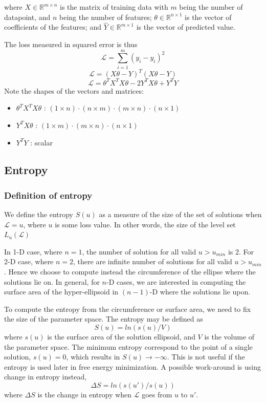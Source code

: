 \documentclass{article}
\begin{document}
where $X \in \mathbb{R}^{m \times n}$ is the matrix of training data with $m$ being the number of datapoint, and $n$ being the number of features; $\theta \in \mathbb{R}^{n \times 1}$ is the vector of coefficients of the features; and $\hat{Y} \in \mathbb{R}^{m \times 1}$ is the vector of predicted value.

\par
The loss measured in squared error is thus
\[
\mathcal{L} = \sum_{i=1}^{m}(y_i - \hat{y_i})^2
\]
\[
\mathcal{L} = (X\theta-Y)^T(X\theta-Y)
\]
\[
\mathcal{L} = \theta^T X^T X\theta - 2Y^T X\theta + Y^T Y
\]
Note the shapes of the vectors and matrices:
\begin{itemize}
  \item $\theta^T X^T X\theta$ : $(1 \times n)\cdot(n \times m)\cdot(m \times n)\cdot(n \times 1)$
  \item $Y^T X\theta$ : $(1 \times m)\cdot(m \times n)\cdot(n \times 1)$
  \item $Y^T Y$ : scalar
\end{itemize}

\subsection{Entropy}
\subsubsection{Definition of entropy}
We define the entropy $S(u)$ as a measure of the size of the set of solutions when $\mathcal{L} = u$, where $u$ is some loss value. In other words, the size of the level set $L_u(\mathcal{L})$

\par
In 1-D case, where $n=1$, the number of solution for all valid $u > u_{min}$ is 2. For 2-D case, where $n=2$, there are infinite number of solutions for all valid $u > u_{min}$. Hence we choose to compute instead the circumference of the ellipse where the solutions lie on. In general, for $n$-D cases, we are interested in computing the surface area of the hyper-ellipsoid in $(n-1)$-D where the solutions lie upon.

\par
To compute the entropy from the circumference or surface area, we need to fix the size of the parameter space. The entropy may be defined as
\[
S(u) = ln(s(u)/V)
\]
where $s(u)$ is the surface area of the solution ellipsoid, and $V$ is the volume of the parameter space.
The minimum entropy correspond to the point of a single solution, $s(u) = 0$, which results in $S(u) \rightarrow -\infty$. This is not useful if the entropy is used later in free energy minimization. A possible work-around is using change in entropy instead,
\[
\Delta S = ln(s(u')/s(u))
\]
where $\Delta S$ is the change in entropy when $\mathcal{L}$ goes from $u$ to $u'$.
\end{document}
